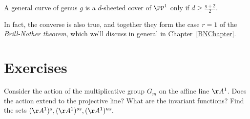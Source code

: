 \begin{corollary}\label{BN dim 1}
A general curve of genus $g$ is a $d$-sheeted cover of $\PP^1$ only if $d \geq \frac{g+2}{2}$.
\end{corollary}

In fact, the converse is also true, and together they form the case $r=1$ of the \emph{Brill-Nother theorem}, which we'll discuss in general in Chapter~\ref{BNChapter}. 

\section{Exercises}

\begin{exercise}
Consider the action of the multiplicative group $G_m$ on the affine line $\AA^1$. Does the action extend
to the projective line? What are the invariant functions? Find the sets $(\AA^1)^s, (\AA^1)^{ss}, (\AA^1)^{us}.$
\end{exercise}


